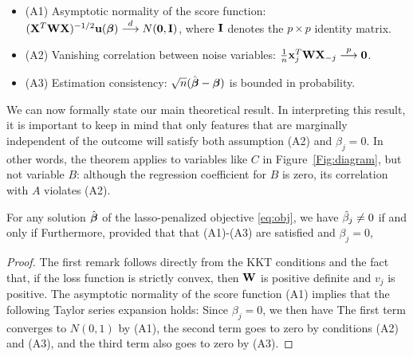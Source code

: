 \begin{itemize}
\item (A1) Asymptotic normality of the score function: $(\mathbf{X}^T\mathbf{W}\mathbf{X})^{-1/2}\mathbf{u}(\boldsymbol{\beta}) \overset{d}{\longrightarrow} N(\mathbf{0},  \mathbf{I})$, where $\mathbf{I}$ denotes the $p \times p$ identity matrix.
\item (A2) Vanishing correlation between noise variables: $\frac{1}{n}\mathbf{x}_j^T\mathbf{W}\mathbf{X}_{-j} \overset{p}{\longrightarrow} \mathbf{0}$.
\item (A3) Estimation consistency: $\sqrt{n}(\hat{\boldsymbol{\beta}}-  \boldsymbol{\beta})$ is bounded in probability.
\end{itemize}

We can now formally state our main theoretical result.  In interpreting this result, it is important to keep in mind that only features that are marginally independent of the outcome will satisfy both assumption (A2) and $\beta_j=0$.
In other words, the theorem applies to variables like $C$ in Figure~\ref{Fig:diagram}, but not variable $B$: although the regression coefficient for $B$ is zero, its correlation with $A$ violates (A2).

\begin{theorem}
  \label{Thm:main}
  For any solution $\hat{\boldsymbol{\beta}}$ of the lasso-penalized objective \eqref{eq:obj}, we have $\hat{\beta}_j \neq 0$ if and only if
  Furthermore, provided that that (A1)-(A3) are satisfied and $\beta_j=0$,
\end{theorem}


\begin{proof}
  The first remark follows directly from the KKT conditions and the fact that, if the loss function is strictly convex, then $\mathbf{W}$ is positive definite and $v_j$ is positive.  The asymptotic normality of the score function (A1) implies that the following Taylor series expansion holds:
Since $\beta_j=0$, we then have
The first term converges to $N(0,1)$ by (A1), the second term goes to zero by conditions (A2) and (A3), and the third term also goes to zero by (A3).
\end{proof}

